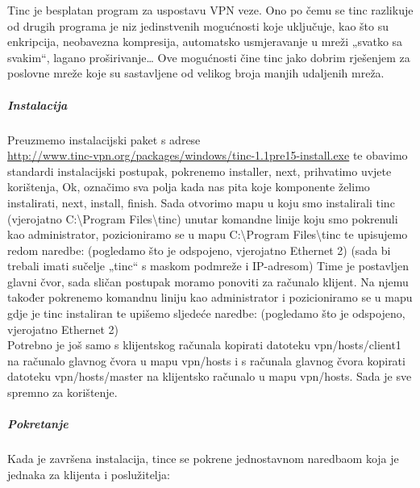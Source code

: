 \hfill \smallbreak
Tinc je besplatan program za uspostavu VPN veze. Ono po čemu se tinc razlikuje od drugih programa je niz jedinstvenih mogućnosti koje uključuje, kao što su enkripcija, neobavezna kompresija, automatsko usmjeravanje u mreži „svatko sa svakim“, lagano proširivanje… Ove mogućnosti čine tinc jako dobrim rješenjem za poslovne mreže koje su sastavljene od velikog broja manjih udaljenih mreža.

\subparagraph{Instalacija}
\hfill \smallbreak
Preuzmemo instalacijski paket s adrese\\ 
\url{http://www.tinc-vpn.org/packages/windows/tinc-1.1pre15-install.exe} te obavimo standardi instalacijski postupak, pokrenemo installer, next, prihvatimo uvjete korištenja, Ok, označimo sva polja kada nas pita koje komponente želimo instalirati, next, install, finish. Sada otvorimo mapu u koju smo instalirali tinc (vjerojatno C:\textbackslash Program Files\textbackslash tinc) unutar komandne linije koju smo pokrenuli kao administrator, pozicioniramo se u mapu C:\textbackslash Program Files\textbackslash tinc te upisujemo redom naredbe:
\FloatBarrier
\smallbreak {}
\smallbreak {}
\smallbreak {}
\smallbreak {}
\smallbreak {}
\smallbreak {}
\smallbreak {}    (pogledamo što je odspojeno, vjerojatno Ethernet 2)
\smallbreak {}
\smallbreak {}
\smallbreak {}  (sada bi trebali imati sučelje „tinc“ s maskom podmreže i IP-adresom)
\FloatBarrier
Time je postavljen glavni čvor, sada sličan postupak moramo ponoviti za računalo klijent. Na njemu također pokrenemo komandnu liniju kao administrator i pozicioniramo se u mapu gdje je tinc instaliran te upišemo sljedeće naredbe:
\FloatBarrier
\smallbreak {}
\smallbreak {}
\smallbreak {}
\smallbreak {}
\smallbreak {}
\smallbreak {}
\smallbreak {}   (pogledamo što je odspojeno, vjerojatno Ethernet 2)
\smallbreak {}
\smallbreak {}\\
\FloatBarrier
Potrebno je još samo s klijentskog računala kopirati datoteku vpn/hosts/client1 na računalo glavnog čvora u mapu vpn/hosts
i s računala glavnog čvora kopirati datoteku vpn/hosts/master na klijentsko računalo u mapu vpn/hosts. Sada je sve spremno za korištenje.

\subparagraph{Pokretanje}
\hfill \smallbreak
Kada je završena instalacija, tince se pokrene jednostavnom naredbaom koja je jednaka za klijenta i poslužitelja:
\FloatBarrier
\smallbreak {}